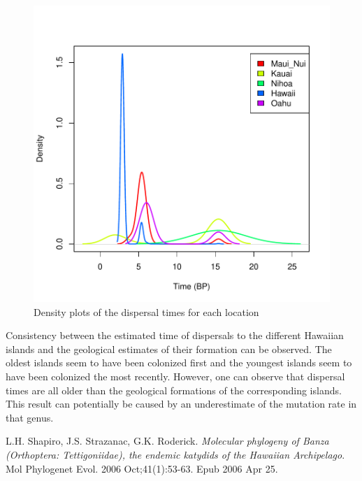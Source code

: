 \documentclass[a4paper]{article}
\begin{document}
\begin{figure}[h!]
\begin{center}
\includegraphics[width=.9\textwidth]{figures/timemig.pdf}
\caption{Density plots of the dispersal times for each location}
\end{center}
\end{figure}

Consistency between the estimated time of dispersals to the different Hawaiian islands and the geological estimates of their formation can be observed.
The oldest islands seem to have been colonized first and the youngest islands seem to have been colonized the most recently.
However, one can observe that dispersal times are all older than the geological formations of the corresponding islands.
This result can potentially be caused by an underestimate of the mutation rate in that genus\cite{hawaii}.

\newpage
\begin{thebibliography}{9}
        L.H. Shapiro, J.S. Strazanac,  G.K. Roderick.
          \emph{Molecular phylogeny of Banza (Orthoptera: Tettigoniidae), the endemic katydids of the Hawaiian Archipelago}.
          Mol Phylogenet Evol. 2006 Oct;41(1):53-63. Epub 2006 Apr 25.
\end{thebibliography}
\end{document}
